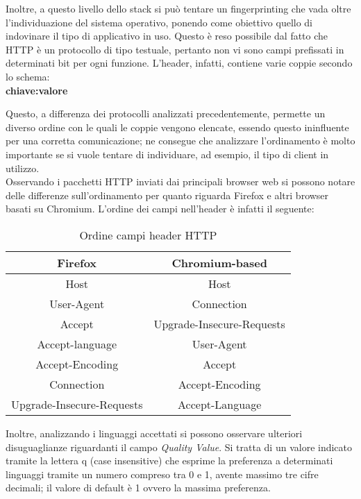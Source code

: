 Inoltre, a questo livello dello stack si può tentare un fingerprinting che vada oltre l'individuazione del sistema operativo, ponendo come obiettivo quello di indovinare il tipo di applicativo in uso.
Questo è reso possibile dal fatto che HTTP è un protocollo di tipo testuale, pertanto non vi sono campi prefissati in determinati bit per ogni funzione.
L'header, infatti, contiene varie coppie secondo lo schema:\\
\textbf{chiave:valore} 


Questo, a differenza dei protocolli analizzati precedentemente, permette un diverso ordine con le quali le coppie vengono elencate, essendo questo ininfluente per una corretta comunicazione; ne consegue che analizzare l'ordinamento è molto importante se si vuole tentare di individuare, ad esempio, il tipo di client in utilizzo.\\

Osservando i pacchetti HTTP inviati dai principali browser web si possono notare delle differenze sull'ordinamento per quanto riguarda Firefox e altri browser basati su Chromium.
L'ordine dei campi nell'header è infatti il seguente:

\begin{table}[h]
	\centering
	\begin{tabular}{| c | c |}
		\hline
		\textbf{Firefox} & \textbf{Chromium-based}
		\\
		\hline
		Host & Host
		\\
		\hline
		User-Agent & Connection
		\\
		\hline
		Accept & Upgrade-Insecure-Requests
		\\
		\hline
		Accept-language & User-Agent
		\\
		\hline
		Accept-Encoding & Accept
		\\
		\hline
		Connection & Accept-Encoding
		\\
		\hline
		Upgrade-Insecure-Requests & Accept-Language
		\\
		\hline
	\end{tabular}
	\caption{Ordine campi header HTTP}
	\label{tab:ordineHTTP}
\end{table}

Inoltre, analizzando i linguaggi accettati si possono osservare ulteriori disuguaglianze riguardanti il campo \textit{Quality Value}.
Si tratta di un valore indicato tramite la lettera q (case insensitive) che esprime la preferenza a determinati linguaggi tramite un numero compreso tra 0 e 1, avente massimo tre cifre decimali; il valore di default è 1 ovvero la massima preferenza. \cite{qvalue} 

